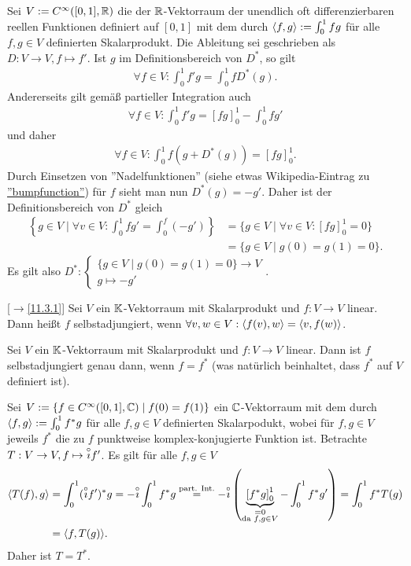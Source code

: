\documentclass[../../main.tex]{subfiles}
\begin{document}
\begin{bsp}\label{15.1.2}
Sei $V:=C^\infty([0,1], \mathbb R)$ die der $\mathbb R$-Vektorraum der unendlich oft differenzierbaren reellen Funktionen definiert auf $[0,1]$ mit dem durch $\langle f,g\rangle:=\int_0^1 fg$ für alle $f,g\in V$ definierten Skalarprodukt. Die Ableitung sei geschrieben als $D: V\to V, f\mapsto f'$. Ist $g$ im Definitionsbereich von $D^*$, so gilt
\begin{align*}
\forall f\in V: \int_0^1f'g=\int_0^1 fD^*(g).
\end{align*}
Andererseits gilt gemäß partieller Integration auch
\begin{align*}
\forall f\in V: \int_0^1f'g=\left[fg\right]_0^1-\int_0^1 fg'
\end{align*}
und daher
\begin{align*}
\forall f\in V: \int_0^1 f(g+D^*(g))=\left[fg\right]_0^1.
\end{align*}
Durch Einsetzen von ''Nadelfunktionen'' (siehe etwas Wikipedia-Eintrag zu \href{https://en.wikipedia.org/wiki/Bump_function}{''bumpfunction''}) für $f$ sieht man nun $D^*(g)=-g'$. Daher ist der Definitionsbereich von $D^*$ gleich
\begin{align*}
\left\{g\in V\mid \forall v\in V: \int_0^1fg'=\int_0^f(-g')\right\}&=\{g\in V\mid \forall v\in V: \left[fg\right]_0^1=0\}\\
&=\{g\in V\mid g(0)=g(1)=0\}.
\end{align*}
Es gilt also $D^*:\begin{cases}\{g\in V\mid g(0)=g(1)=0\}\to V\\g\mapsto-g'\end{cases}$.
\end{bsp}

\begin{er}\mbox{}[$\to$\ref{11.3.1}]
\label{15.1.3}
Sei $V$ ein $\mathbb K$-Vektorraum mit Skalarprodukt und $f: V\to V$ linear. Dann heißt $f$ selbstadjungiert, wenn $\forall v,w\in V: \langle f(v),w\rangle=\langle v,f(w)\rangle$.
\end{er}

\begin{pro}\label{15.1.4}
Sei $V$ ein $\mathbb K$-Vektorraum mit Skalarprodukt und $f: V\to V$ linear. Dann ist $f$ selbstadjungiert genau dann, wenn $f=f^*$ (was natürlich beinhaltet, dass $f^*$ auf $V$ definiert ist).
\end{pro}
	
\begin{bsp}\label{15.1.5}
Sei $V:=\{f\in C^\infty([0,1],\mathbb C)\mid f(0)=f(1)\}$ ein $\mathbb C$-Vektorraum mit dem durch $\langle f,g\rangle:=\int_0^1 f^*g$ für alle $f,g\in V$ definierten Skalarpodukt, wobei für $f,g\in V$ jeweils $f^*$ die zu $f$ punktweise komplex-konjugierte Funktion ist. Betrachte $T: V\to V, f\mapsto \overset\circ\imath f'$.  Es gilt für alle $f,g\in V$
\begin{align*}
\langle T(f),g\rangle&=\int_0^1(\overset\circ\imath f')^*g=-\overset\circ\imath \int_0^1 f^*g\stackrel{\text{part. Int.}}{=}-\overset\circ\imath\left(\underbrace{\left[f^*g\right]_0^1}_{\substack{\small=0\\\text{da }f,g\in V}}-\int_0^1 f^*g'\right)=\int_0^1 f^*T(g)\\
&=\langle f,T(g)\rangle.
\end{align*}
Daher ist $T=T^*$.
\end{bsp}
\end{document}
